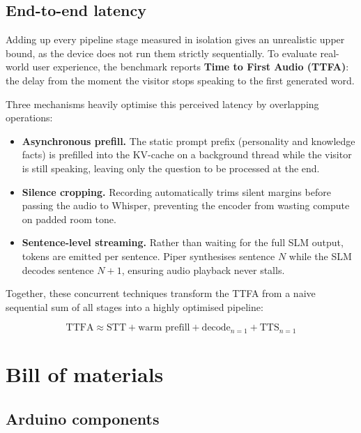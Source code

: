 \documentclass[11pt,a4paper]{article}
\begin{document}

\subsection{End-to-end latency}
\label{sec:latency}

Adding up every pipeline stage measured in isolation gives an unrealistic upper bound, as the device does not run them strictly sequentially. To evaluate real-world user experience, the benchmark reports \textbf{Time to First Audio (TTFA)}: the delay from the moment the visitor stops speaking to the first generated word. 

Three mechanisms heavily optimise this perceived latency by overlapping operations:

\begin{itemize}
  \item \textbf{Asynchronous prefill.} The static prompt prefix (personality and knowledge facts) is prefilled into the KV-cache on a background thread while the visitor is still speaking, leaving only the question to be processed at the end.
  \item \textbf{Silence cropping.} Recording automatically trims silent margins before passing the audio to Whisper, preventing the encoder from wasting compute on padded room tone.
  \item \textbf{Sentence-level streaming.} Rather than waiting for the full SLM output, tokens are emitted per sentence. Piper synthesises sentence $N$ while the SLM decodes sentence $N+1$, ensuring audio playback never stalls.
\end{itemize}

Together, these concurrent techniques transform the TTFA from a naive sequential sum of all stages into a highly optimised pipeline:

\begin{equation*}
\text{TTFA} \approx \text{STT} + \text{warm prefill} + \text{decode}_{n=1} + \text{TTS}_{n=1}
\end{equation*}


\section{Bill of materials}

\subsection{Arduino components}
\end{document}
